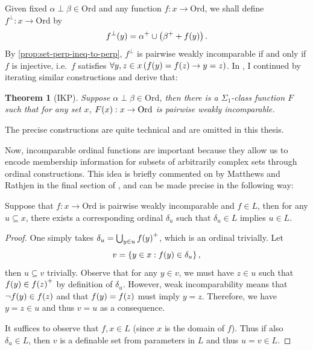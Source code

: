 \documentclass[12pt,openany]{book}
\theoremstyle{plain}
\newtheorem{theorem}{Theorem}[section]
\theoremstyle{definition}
\newcommand\opA[1]{\mathop{\forall #1}}
\newcommand\IKP{\mathrm{IKP}}
\newcommand\Ord{\mathrm{Ord}}
\begin{document}
Given fixed $\alpha \perp \beta \in \Ord$ and any function $f : x \rightarrow \Ord$, we shall define $f^\perp : x \rightarrow \Ord$ by
\[f^\perp\mleft(y\mright) = \alpha ^+ \cup \left(\beta^+ + f\mleft(y\mright)\right).\]
By \autoref{prop:set-perp-ineq-to-perp}, $f^\perp$ is pairwise weakly incomparable if and only if $f$ is injective, i.e.\ $f$ satisfies $\opA{y, z \in x} \left(f\mleft(y\mright) = f\mleft(z\mright) \rightarrow y = z\right)$. In \cite{wang-sw25-antichain-pre}, I continued by iterating similar constructions and derive that:
\begin{theorem}[$\IKP$]
  \label{thm:set-perp-class-func}
  Suppose $\alpha \perp \beta \in \Ord$, then there is a $\Sigma_1$-class function $F$ such that for any set $x$, $F\mleft(x\mright) : x \rightarrow \Ord$ is pairwise weakly incomparable.
\end{theorem}

The precise constructions are quite technical and are omitted in this thesis.

Now, incomparable ordinal functions are important because they allow us to encode membership information for subsets of arbitrarily complex sets through ordinal constructions. This idea is briefly commented on by Matthews and Rathjen in the final section of \cite{matthews-rathjen24-constructible-universe}, and can be made precise in the following way:
\begin{proposition}
  \label{prop:set-perp-encode-subset}
  Suppose that $f : x \rightarrow \Ord$ is pairwise weakly incomparable and $f \in L$, then for any $u \subseteq x$, there exists a corresponding ordinal $\delta_u$ such that $\delta_u \in L$ implies $u \in L$.
\end{proposition}

\begin{proof}
  One simply takes $\delta_u = \bigcup_{y \in u} f\mleft(y\mright)^+$, which is an ordinal trivially. Let
  \[v = \left\{y \in x : f\mleft(y\mright) \in \delta_u\right\},\]
  then $u \subseteq v$ trivially. Observe that for any $y \in v$, we must have $z \in u$ such that $f\mleft(y\mright) \in f\mleft(z\mright)^+$ by definition of $\delta_u$. However, weak incomparability means that $\neg f\mleft(y\mright) \in f\mleft(z\mright)$ and that $f\mleft(y\mright) = f\mleft(z\mright)$ must imply $y = z$. Therefore, we have $y = z \in u$ and thus $v = u$ as a consequence.

  It suffices to observe that $f, x \in L$ (since $x$ is the domain of $f$). Thus if also $\delta_u \in L$, then $v$ is a definable set from parameters in $L$ and thus $u = v \in L$.
\end{proof}
\end{document}
